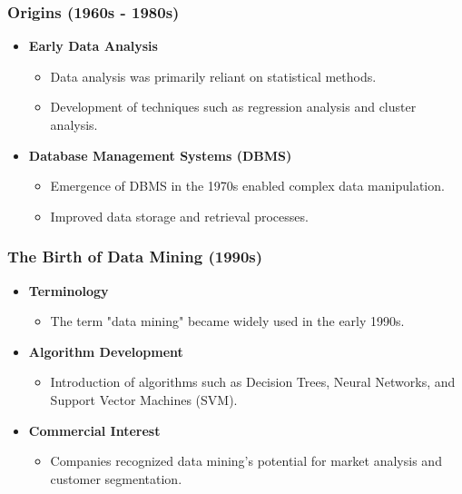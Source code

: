 \documentclass[aspectratio=169]{beamer}
\begin{document}
\begin{frame}[fragile]
    \frametitle{Origins (1960s - 1980s)}
    \begin{itemize}
        \item \textbf{Early Data Analysis}
            \begin{itemize}
                \item Data analysis was primarily reliant on statistical methods.
                \item Development of techniques such as regression analysis and cluster analysis.
            \end{itemize}
        \item \textbf{Database Management Systems (DBMS)}
            \begin{itemize}
                \item Emergence of DBMS in the 1970s enabled complex data manipulation.
                \item Improved data storage and retrieval processes.
            \end{itemize}
    \end{itemize}
\end{frame}

\begin{frame}[fragile]
    \frametitle{The Birth of Data Mining (1990s)}
    \begin{itemize}
        \item \textbf{Terminology}
            \begin{itemize}
                \item The term "data mining" became widely used in the early 1990s.
            \end{itemize}
        \item \textbf{Algorithm Development}
            \begin{itemize}
                \item Introduction of algorithms such as Decision Trees, Neural Networks, and Support Vector Machines (SVM).
            \end{itemize}
        \item \textbf{Commercial Interest}
            \begin{itemize}
                \item Companies recognized data mining's potential for market analysis and customer segmentation.
            \end{itemize}
    \end{itemize}
\end{frame}
\end{document}
